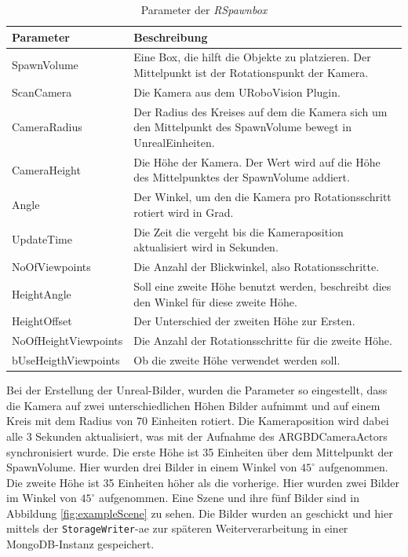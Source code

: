 \begin{table}
\begin{tabularx}{\textwidth}{lX}
\textbf{Parameter}  & \textbf{Beschreibung} \\ \hline
SpawnVolume         & Eine Box, die hilft die Objekte zu platzieren. Der Mittelpunkt ist der Rotationspunkt der Kamera.\\  
ScanCamera          & Die Kamera aus dem URoboVision Plugin. \\ 
CameraRadius        & Der Radius des Kreises auf dem die Kamera sich um den Mittelpunkt des SpawnVolume bewegt in UnrealEinheiten.\\ 
CameraHeight        & Die Höhe der Kamera. Der Wert wird auf die Höhe des Mittelpunktes der SpawnVolume addiert.\\ 
Angle               & Der Winkel, um den die Kamera pro Rotationsschritt rotiert wird in Grad.\\ 
UpdateTime          & Die Zeit die vergeht bis die Kameraposition aktualisiert wird in Sekunden.\\ 
NoOfViewpoints      & Die Anzahl der Blickwinkel, also Rotationsschritte.\\ 
HeightAngle         & Soll eine zweite Höhe benutzt werden, beschreibt dies den Winkel für diese zweite Höhe.\\ 
HeightOffset        & Der Unterschied der zweiten Höhe zur Ersten.\\
NoOfHeightViewpoints & Die Anzahl der Rotationsschritte für die zweite Höhe.\\ 
bUseHeigthViewpoints & Ob die zweite Höhe verwendet werden soll. \\  \hline
\end{tabularx}
\caption{Parameter der \textit{RSpawnbox}}
\label{tab:spawnboxParams}
\end{table}

Bei der Erstellung der Unreal-Bilder, wurden die Parameter so eingestellt, dass die Kamera auf zwei unterschiedlichen Höhen Bilder aufnimmt und auf einem Kreis mit dem Radius von 70 Einheiten rotiert. Die Kameraposition wird dabei alle 3 Sekunden aktualisiert, was mit der Aufnahme des ARGBDCameraActors synchronisiert wurde. Die erste Höhe ist 35 Einheiten über dem Mittelpunkt der SpawnVolume. Hier wurden drei Bilder in einem Winkel von $45^\circ$ aufgenommen. Die zweite Höhe ist 35 Einheiten höher als die vorherige. Hier wurden zwei Bilder im Winkel von $45^\circ$ aufgenommen. Eine Szene und ihre fünf Bilder sind in Abbildung \ref{fig:exampleScene} zu sehen. Die Bilder wurden an \robosherlock geschickt und hier mittels der \texttt{StorageWriter}-\gls{ae} zur späteren Weiterverarbeitung in einer MongoDB-Instanz gespeichert.

